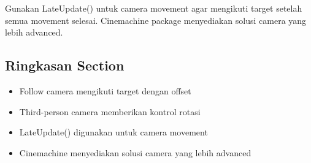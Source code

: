 \begin{catatan}
Gunakan LateUpdate() untuk camera movement agar mengikuti target setelah semua movement selesai. Cinemachine package menyediakan solusi camera yang lebih advanced.
\end{catatan}

\subsection{Ringkasan Section}

\begin{itemize}
\item Follow camera mengikuti target dengan offset
\item Third-person camera memberikan kontrol rotasi
\item LateUpdate() digunakan untuk camera movement
\item Cinemachine menyediakan solusi camera yang lebih advanced
\end{itemize}
